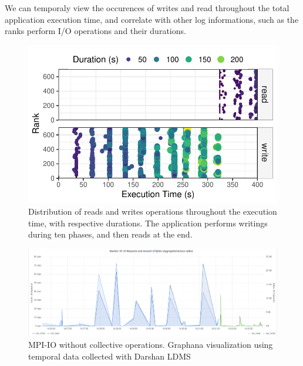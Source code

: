       We can temporaly view the occurences of writes and read
      throughout the total application execution time, and correlate
      with other log informations, such as the ranks perform I/O
      operations and their durations.

\begin{figure}
	\centering
	\includegraphics[width=\linewidth]{figs/255653_mpi_io_luster_no_coll_execution2.pdf}
	\caption{Distribution of reads and writes operations
          throughout the execution time, with respective
          durations. The application performs writings during ten
          phases, and then reads at the end.}
	\label{f:mpi_io}
\end{figure}

\begin{figure}
	\centering
	\includegraphics[width=\textwidth]{figs/255653_mpi_io_luster_no_coll.pdf}
	\caption{MPI-IO without collective operations. Graphana visualization using temporal data collected
          with Darshan LDMS}
	\label{f:CSV Header and Output}
      \end{figure}

